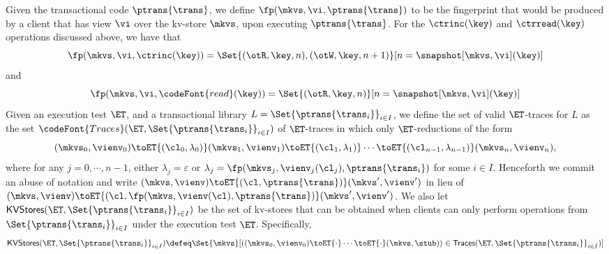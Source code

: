 Given the transactional code 
$\ptrans{\trans}$, we define $\fp(\mkvs, \vi, \ptrans{\trans})$ 
to be the fingerprint that would be produced by a client that has view $\vi$ 
over the kv-store $\mkvs$, upon executing $\ptrans{\trans}$.
For the $\ctrinc(\key)$ and $\ctrread(\key)$ operations discussed above, 
we have that 
\[\fp(\mkvs, \vi, \ctrinc(\key)) = \Set{(\otR, \key, n), (\otW, \key, n+1) }[n = \snapshot[\mkvs, \vi](\key) ]\]
and \[\fp(\mkvs, \vi ,\codeFont{read}(\key)) = \Set{(\otR, \key, n) }[ n = \snapshot[\mkvs, \vi](\key) ]\]
Given an execution test $\ET$, and a transactional library $L = \Set{\ptrans{\trans_i}}_{i \in I}$, 
we define the set of valid $\ET$-traces for $L$ as the set 
$\codeFont{Traces}(\ET, \Set{\ptrans{\trans_i}}_{i \in I})$ 
of $\ET$-traces in which only $\ET$-reductions of the form 
\[
(\mkvs_{0}, \vienv_{0}) \toET{(\cl_0, \lambda_0)} (\mkvs_{1}, \vienv_{1}) \toET{(\cl_1, \lambda_1)} \cdots 
\toET{(\cl_{n-1}, \lambda_{n-1})} (\mkvs_{n}, \vienv_{n}),
\]
where for any $j=0,\cdots,n-1$, either $\lambda_{j} = \varepsilon$ or $\lambda_{j} = \fp(\mkvs_{j}, \vienv_{j}(\cl_{j}), \ptrans{\trans_{i}})$ 
for some $i \in I$. Henceforth we commit an abuse of notation and write $(\mkvs, \vienv) \toET{(\cl, \ptrans{\trans})} (\mkvs', \vienv')$ 
in lieu of $(\mkvs, \vienv) \toET{(\cl, \fp(\mkvs,\vienv(\cl), \ptrans{\trans})} (\mkvs', \vienv')$.
We also let $\mathsf{KVStores}(\ET, \Set{\ptrans{\trans_i}}_{i \in I})$ be the set of kv-stores 
that can be obtained when clients can only perform operations from $\Set{\ptrans{\trans_i}}_{i \in I}$ 
under the execution test $\ET$. Specifically, 
\[
    \mathsf{KVStores}(\ET, \Set{\ptrans{\trans_i}}_{i \in I}) \defeq
    \Set{ \mkvs }[%
        \left( (\mkvs_0, \vienv_{0}) \toET{\cdot} \cdots \toET{\cdot} (\mkvs, \stub) \right)
        \in \mathsf{Traces}(\ET, \Set{\ptrans{\trans_{i}}}_{i \in I}) ]
\]

